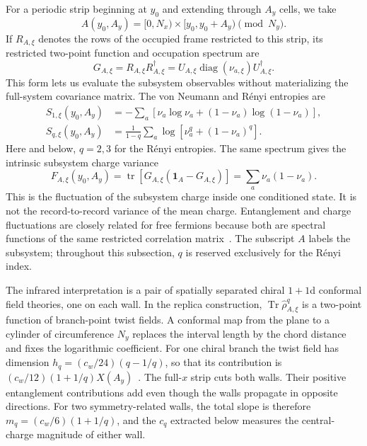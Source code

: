 \documentclass[aps,prb,twocolumn,superscriptaddress,longbibliography,floatfix]{revtex4-2}
\theoremstyle{plain}
\theoremstyle{definition}
\theoremstyle{remark}
\begin{document}
For a periodic strip beginning at $y_0$ and extending through $A_y$ cells,
we take
\begin{equation}
 A(y_0,A_y)=[0,N_x)\times[y_0,y_0+A_y)\pmod{N_y}.
 \label{eq:HardWallStripRegion}
\end{equation}
If $R_{A,\xi}$ denotes the rows of the occupied frame restricted to this
strip, its restricted two-point function and occupation spectrum are
\begin{equation}
 G_{A,\xi}=R_{A,\xi}R_{A,\xi}^{\dagger}
 =U_{A,\xi}\operatorname{diag}(\nu_{a,\xi})U_{A,\xi}^{\dagger}.
 \label{eq:HardWallRestrictedCorrelation}
\end{equation}
This form lets us evaluate the subsystem observables without materializing
the full-system covariance matrix.  The von Neumann and R\'enyi entropies are
\begin{align}
 S_{1,\xi}(y_0,A_y)
 &=-\sum_a\left[\nu_a\log\nu_a+(1-\nu_a)\log(1-\nu_a)\right],
 \nonumber\\
 S_{q,\xi}(y_0,A_y)
 &=\frac{1}{1-q}\sum_a\log\!\left[\nu_a^q+(1-\nu_a)^q\right].
 \label{eq:HardWallRenyiEntropies}
\end{align}
Here and below, $q=2,3$ for the R\'enyi entropies.
The same spectrum gives the intrinsic subsystem charge variance
\begin{equation}
 F_{A,\xi}(y_0,A_y)
 =\operatorname{tr}\!\left[G_{A,\xi}(\mathbf{1}_A-G_{A,\xi})\right]
 =\sum_a\nu_a(1-\nu_a).
 \label{eq:HardWallChargeVariance}
\end{equation}
This is the fluctuation of the subsystem charge inside one conditioned state.
It is not the record-to-record variance of the mean charge.  Entanglement and
charge fluctuations are closely related for free fermions because both are
spectral functions of the same restricted correlation matrix~\cite{KlichLevitov2009,SongFlindtRachel2011}.
The subscript $A$ labels the subsystem; throughout this subsection, $q$ is
reserved exclusively for the R\'enyi index.

The infrared interpretation is a pair of spatially separated chiral
$1+1$d conformal field theories, one on each wall.  In the replica
construction, $\operatorname{Tr}\hat\rho_{A,\xi}^q$ is a two-point function
of branch-point twist fields.  A conformal map from the plane to a cylinder
of circumference $N_y$ replaces the interval length by the chord distance
and fixes the logarithmic coefficient.  For one chiral branch the twist
field has dimension $h_q=(c_w/24)(q-1/q)$, so that its contribution is
$(c_w/12)(1+1/q)X(A_y)$~\cite{CalabreseCardy2004}.  The full-$x$ strip cuts
both walls.  Their positive entanglement contributions add even though the
walls propagate in opposite directions.  For two symmetry-related walls,
the total slope is therefore $m_q=(c_w/6)(1+1/q)$, and the $c_q$ extracted
below measures the central-charge magnitude of either wall.
\end{document}
